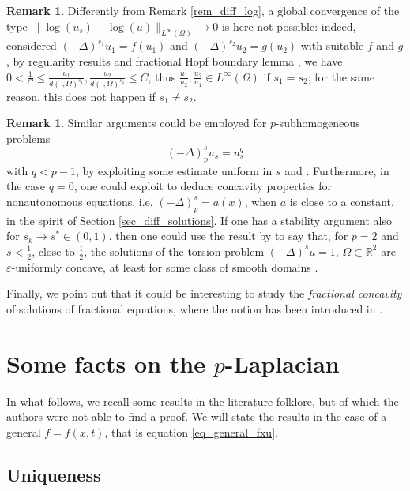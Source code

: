\documentclass[11pt, reqno]{amsart}
\theoremstyle{definition}
\newtheorem{remark}[lemma]{Remark}
\numberwithin{equation}{section}
\newcommand{\R}{\mathbb{R}}
\def\eps{\varepsilon}
\def\norm#1{\|#1\|}
\begin{document}
\begin{remark}
Differently from Remark \ref{rem_diff_log}, a global convergence of the type $\norm{\log(u_{s}) - \log(u)}_{L^{\infty}(\Omega)} \to 0$ is here not possible: indeed, considered $(-\Delta)^{s_1} u_1 = f(u_1)$ and $(-\Delta)^{s_2} u_2 = g(u_2)$ with suitable $f$ and $g$, by regularity results \cite[Theorem 4.4]{IMS14} and fractional Hopf boundary lemma \cite[Theorem 1.5(2)]{DpQ17}, we have $0<\frac{1}{C} \leq \frac{u_1}{d(\cdot, \Omega)^{s_1}}, \frac{u_2}{d(\cdot, \Omega)^{s_2}} \leq C$, thus $\frac{u_1}{u_2}, \frac{u_2}{u_1} \in L^{\infty}(\Omega)$ if $s_1=s_2$; for the same reason, this does not happen if $s_1 \neq s_2$.
\end{remark}

\begin{remark}
Similar arguments could be employed for $p$-subhomogeneous problems 
$$(-\Delta)^s_p u_s = u_s^q$$
with $q<p-1$, by exploiting some estimate uniform in $s$ and \cite[Theorem 4.5]{BoSa20}. 
Furthermore, in the case $q=0$, one could exploit \cite[Theorem 3.11]{War16} to deduce concavity properties for nonautonomous equations, i.e. $(-\Delta)^s_p = a(x)$, when $a$ is close to a constant, in the spirit of Section \ref{sec_diff_solutions}.
If one has a stability argument also for $s_k \to s^* \in (0,1)$, then one could use the result by \cite{Kul17} to say that, for $p=2$ and $s <\frac{1}{2}$, close to $\frac{1}{2}$, the solutions of the torsion problem $(-\Delta)^s u = 1$, $\Omega \subset \R^2$ are $\eps$-uniformly concave, at least for some class of smooth domains \cite[Definition 2.1]{Kul17}. 
\end{remark}

 
Finally, we point out that it could be interesting to study the \emph{fractional concavity} of solutions of fractional equations, where the notion has been introduced in \cite{DpQR22}. 


\appendix


\section{Some facts on the $p$-Laplacian}
\label{sec_append_p_lapl}

In what follows, we recall some results in the literature folklore, but of which the authors were not able to find a proof. We will state the results in the case of a general $f=f(x,t)$, that is equation \eqref{eq_general_fxu}.


\subsection{Uniqueness}
\end{document}
